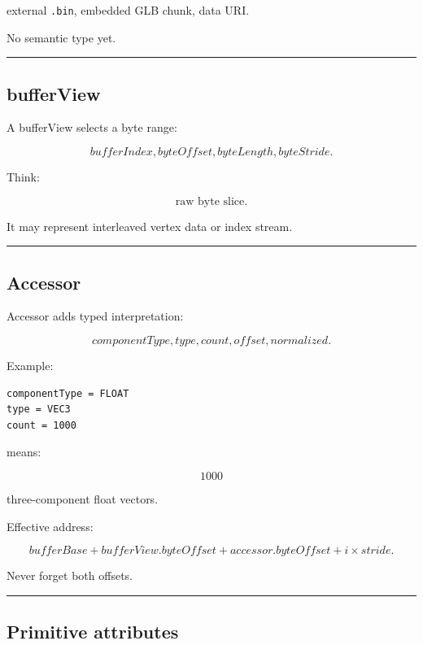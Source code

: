 external \texttt{.bin}, embedded GLB chunk, data URI.

No semantic type yet.

\begin{center}\rule{0.5\linewidth}{0.5pt}\end{center}

\subsection{bufferView}\label{04-visual-computing-ii-ch041-bufferview}

A bufferView selects a byte range:

\[
bufferIndex,
byteOffset,
byteLength,
byteStride.
\]

Think:

\[
\boxed{
\text{raw byte slice}.
}
\]

It may represent interleaved vertex data or index stream.

\begin{center}\rule{0.5\linewidth}{0.5pt}\end{center}

\subsection{Accessor}\label{04-visual-computing-ii-ch041-accessor}

Accessor adds typed interpretation:

\[
componentType,
type,
count,
offset,
normalized.
\]

Example:

\begin{verbatim}
componentType = FLOAT
type = VEC3
count = 1000
\end{verbatim}

means:

\[
1000
\]

three-component float vectors.

Effective address:

\[
\boxed{
bufferBase
+
bufferView.byteOffset
+
accessor.byteOffset
+
i\times stride.
}
\]

Never forget both offsets.

\begin{center}\rule{0.5\linewidth}{0.5pt}\end{center}

\subsection{Primitive attributes}\label{04-visual-computing-ii-ch041-primitive-attributes}

